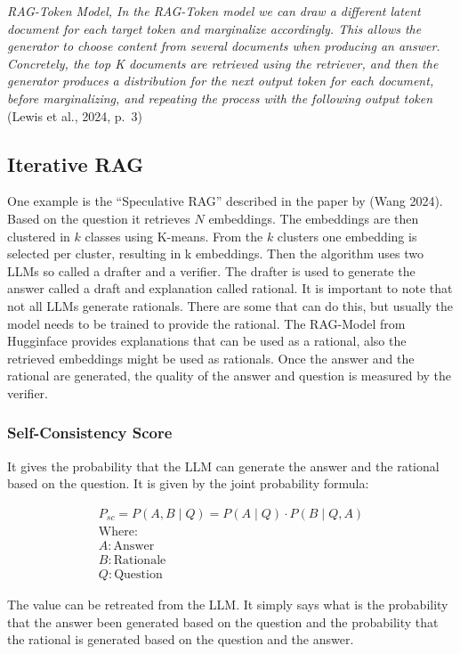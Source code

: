 \documentclass{wseas}
\begin{document}
\emph{RAG-Token Model, In the RAG-Token model we can draw a different
latent document for each target token and marginalize accordingly. This
allows the generator to choose content from several documents when
producing an answer. Concretely, the top K documents are retrieved using
the retriever, and then the generator produces a distribution for the
next output token for each document, before marginalizing, and repeating
the process with the following output token} (Lewis et al., 2024, p.~3)
\cite{cite3}

\subsection{Iterative RAG}

One example is the ``Speculative RAG'' described in the paper \cite{cite18}
by (Wang 2024). Based on the question it retrieves \(N\) embeddings. The
embeddings are then clustered in \(k\) classes using K-means. From the
\(k\) clusters one embedding is selected per cluster, resulting in k
embeddings. Then the algorithm uses two LLMs so called a drafter and a
verifier. The drafter is used to generate the answer called a draft and
explanation called rational. It is important to note that not all LLMs
generate rationals. There are some that can do this, but usually the
model needs to be trained to provide the rational. The RAG-Model from
Hugginface provides explanations that can be used as a rational, also
the retrieved embeddings might be used as rationals. Once the answer and
the rational are generated, the quality of the answer and question is
measured by the verifier.

\subsubsection{Self-Consistency Score}

It gives the probability that the LLM can generate the answer and the
rational based on the question. It is given by the joint probability
formula:

\[
\begin{array}{c}
P_{sc} = P(A,B \mid Q) = P(A \mid Q) \cdot P(B \mid Q, A) \\
 \mathrm{Where:} \\
A : \mathrm{Answer} \\
B : \mathrm{Rationale} \\
Q : \mathrm{Question}
\end{array}
\]

The value can be retreated from the LLM. It simply says what is the
probability that the answer been generated based on the question and the
probability that the rational is generated based on the question and the
answer.
\end{document}
